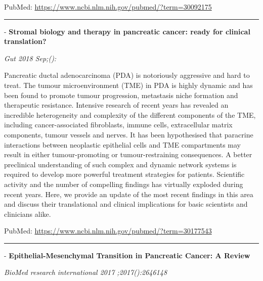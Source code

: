 \documentclass[]{article}
\begin{document}
PubMed: \url{https://www.ncbi.nlm.nih.gov/pubmed/?term=30092175}

{}

{}

\begin{center}\rule{0.5\linewidth}{\linethickness}\end{center}

 - \textbf{Stromal biology and therapy in pancreatic cancer: ready for
clinical translation?}

\emph{Gut 2018 Sep;():}

Pancreatic ductal adenocarcinoma (PDA) is notoriously aggressive and
hard to treat. The tumour microenvironment (TME) in PDA is highly
dynamic and has been found to promote tumour progression, metastasis
niche formation and therapeutic resistance. Intensive research of recent
years has revealed an incredible heterogeneity and complexity of the
different components of the TME, including cancer-associated
fibroblasts, immune cells, extracellular matrix components, tumour
vessels and nerves. It has been hypothesised that paracrine interactions
between neoplastic epithelial cells and TME compartments may result in
either tumour-promoting or tumour-restraining consequences. A better
preclinical understanding of such complex and dynamic network systems is
required to develop more powerful treatment strategies for patients.
Scientific activity and the number of compelling findings has virtually
exploded during recent years. Here, we provide an update of the most
recent findings in this area and discuss their translational and
clinical implications for basic scientists and clinicians alike.

PubMed: \url{https://www.ncbi.nlm.nih.gov/pubmed/?term=30177543}

{}

{}

\begin{center}\rule{0.5\linewidth}{\linethickness}\end{center}

 - \textbf{Epithelial-Mesenchymal Transition in Pancreatic Cancer: A
Review}

\emph{BioMed research international 2017 ;2017():2646148}
\end{document}
